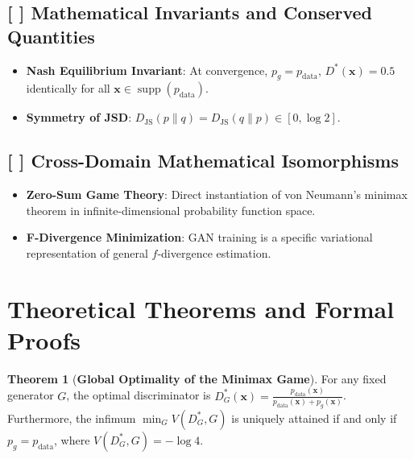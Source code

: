 \documentclass[11pt,a4paper]{article}
\theoremstyle{definition}
\newtheorem{theorem}{\textbf{Theorem}}[section]
\begin{document}
\subsection{[ ] Mathematical Invariants and Conserved Quantities}
\begin{itemize}
    \item \textbf{Nash Equilibrium Invariant}: At convergence, $p_g = p_{\text{data}}$, $D^*(\mathbf{x}) = 0.5$ identically for all $\mathbf{x} \in \operatorname{supp}(p_{\text{data}})$.
    \item \textbf{Symmetry of JSD}: $D_{\text{JS}}(p \parallel q) = D_{\text{JS}}(q \parallel p) \in [0, \log 2]$.
\end{itemize}

\subsection{[ ] Cross-Domain Mathematical Isomorphisms}
\begin{itemize}
    \item \textbf{Zero-Sum Game Theory}: Direct instantiation of von Neumann's minimax theorem in infinite-dimensional probability function space.
    \item \textbf{F-Divergence Minimization}: GAN training is a specific variational representation of general $f$-divergence estimation.
\end{itemize}

\section{Theoretical Theorems and Formal Proofs}

\begin{theorem}[\textbf{Global Optimality of the Minimax Game}]
For any fixed generator $G$, the optimal discriminator is $D^*_G(\mathbf{x}) = \frac{p_{\text{data}}(\mathbf{x})}{p_{\text{data}}(\mathbf{x}) + p_g(\mathbf{x})}$. Furthermore, the infimum $\min_G V(D^*_G, G)$ is uniquely attained if and only if $p_g = p_{\text{data}}$, where $V(D^*_G, G) = -\log 4$.
\end{theorem}
\end{document}
